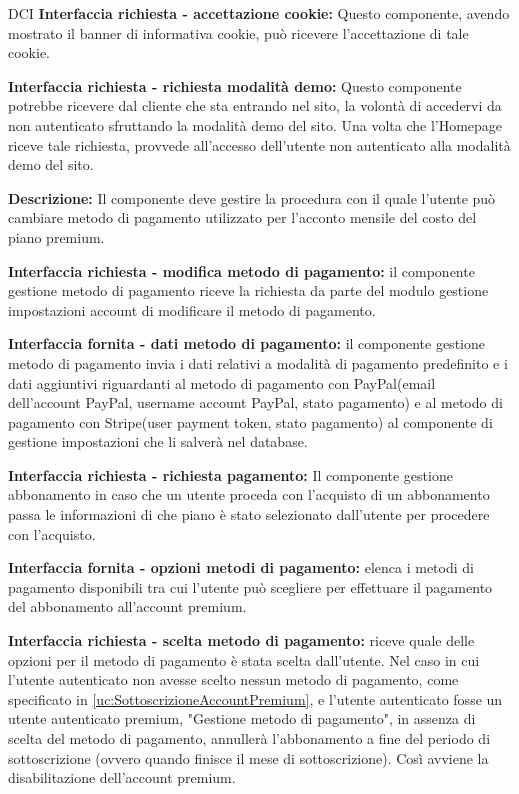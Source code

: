 \begin{listaPersonale}{DCI}
    \textbf{Interfaccia richiesta - accettazione cookie:} Questo componente, avendo mostrato il banner di informativa cookie, può ricevere l'accettazione di tale cookie.

    \textbf{Interfaccia richiesta - richiesta modalità demo:} Questo componente potrebbe ricevere dal cliente che sta entrando nel sito, la volontà di accedervi da non autenticato sfruttando la modalità demo del sito. Una volta che l'Homepage riceve tale richiesta, provvede all'accesso dell'utente non autenticato alla modalità demo del sito.



    \textbf{Descrizione:} Il componente deve gestire la procedura con il quale l'utente può cambiare metodo di pagamento utilizzato per l'acconto mensile del costo del piano premium.

    \textbf{Interfaccia richiesta - modifica metodo di pagamento:} il componente gestione metodo di pagamento riceve la richiesta da parte del modulo gestione impostazioni account di modificare il metodo di pagamento.

    \textbf{Interfaccia fornita - dati metodo di pagamento:} il componente gestione metodo di pagamento invia i dati relativi a modalità di pagamento predefinito e i dati aggiuntivi riguardanti al metodo di pagamento con PayPal(email dell'account PayPal, username account PayPal, stato pagamento) e al metodo di pagamento con Stripe(user payment token, stato pagamento) al componente di gestione impostazioni che li salverà nel database.

    \textbf{Interfaccia richiesta - richiesta pagamento:} Il componente gestione abbonamento in caso che un utente proceda con l'acquisto di un abbonamento passa le informazioni di che piano è stato selezionato dall'utente per procedere con l'acquisto.

    \textbf{Interfaccia fornita - opzioni metodi di pagamento:} elenca i metodi di pagamento disponibili tra cui l'utente può scegliere per effettuare il pagamento del abbonamento all'account premium.

    \textbf{Interfaccia richiesta - scelta metodo di pagamento:} riceve quale delle opzioni per il metodo di pagamento è stata scelta dall'utente. Nel caso in cui l'utente autenticato non avesse scelto nessun metodo di pagamento, come specificato in \ref{uc:SottoscrizioneAccountPremium}, e l'utente autenticato fosse un utente autenticato premium, "Gestione metodo di pagamento", in assenza di scelta del metodo di pagamento, annullerà l'abbonamento a fine del periodo di sottoscrizione (ovvero quando finisce il mese di sottoscrizione). Così avviene la disabilitazione dell'account premium.


\end{listaPersonale}

